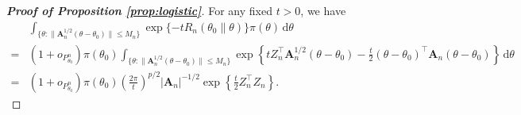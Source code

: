 \documentclass[11pt]{article}
\newcommand{\BA}{\mathbf{A}}    \newcommand{\BB}{\mathbf{B}}    \newcommand{\BC}{\mathbf{C}}    \newcommand{\BD}{\mathbf{D}}    \newcommand{\BE}{\mathbf{E}}    \newcommand{\BF}{\mathbf{F}}    \newcommand{\BG}{\mathbf{G}}    \newcommand{\BH}{\mathbf{H}}    \newcommand{\BI}{\mathbf{I}}    \newcommand{\BJ}{\mathbf{J}}    \newcommand{\BK}{\mathbf{K}}    \newcommand{\BL}{\mathbf{L}}
\newcommand{\myT}{\intercal}
\theoremstyle{plain}
\theoremstyle{definition}
\theoremstyle{remark}
\begin{document}
\begin{appendices}
\begin{proof}[\textbf{Proof of Proposition \ref{prop:logistic}}]
For any fixed $t> 0$, we have
\begin{equation}\label{logistic:part1}
    \begin{split}
    &
    \int_{\{\theta : \|\BA_n^{1/2}(\theta - \theta_0)\| \leq M_n \}} 
    \exp\{-t R_n (\theta_0 \| \theta)\} \pi(\theta) \, \mathrm d \theta
    \\
    =&
(1+o_{P_{\theta_0}^n})\pi(\theta_0)
    \int_{\{\theta : \|\BA_n^{1/2}(\theta - \theta_0)\| \leq M_n \}} 
    \exp\left\{t Z_n^\myT \BA_n^{1/2} (\theta - \theta_0) - \frac{t}{2}(\theta - \theta_0)^\myT \BA_n (\theta - \theta_0)  \right\}  \, \mathrm d \theta
    \\
    =&
(1+o_{P_{\theta_0}^n})\pi(\theta_0)
\left( \frac {2\pi}{t} \right)^{p/2} |\BA_n|^{-1/2} \exp \left\{\frac{t}{2} Z_n^\myT Z_n \right\}.
    \end{split}
\end{equation}


\end{proof}
\end{appendices}
\end{document}
